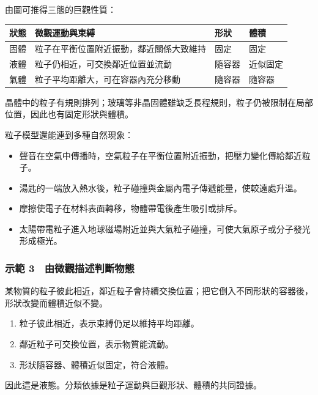 \documentclass[11pt,a4paper]{article}
\newcounter{none}
\providecommand{\tightlist}{%
  \setlength{\itemsep}{0pt}\setlength{\parskip}{0pt}}
\begin{document}
由圖可推得三態的巨觀性質：

{\def\LTcaptype{none} %
\begin{longtable}[]{@{}llll@{}}
\toprule\noalign{}
狀態 & 微觀運動與束縛 & 形狀 & 體積 \\
\midrule\noalign{}
\endhead
\bottomrule\noalign{}
\endlastfoot
固體 & 粒子在平衡位置附近振動，鄰近關係大致維持 & 固定 & 固定 \\
液體 & 粒子仍相近，可交換鄰近位置並流動 & 隨容器 & 近似固定 \\
氣體 & 粒子平均距離大，可在容器內充分移動 & 隨容器 & 隨容器 \\
\end{longtable}
}

晶體中的粒子有規則排列；玻璃等非晶固體雖缺乏長程規則，粒子仍被限制在局部位置，因此也有固定形狀與體積。

粒子模型還能連到多種自然現象：

\begin{itemize}
\tightlist
\item
  聲音在空氣中傳播時，空氣粒子在平衡位置附近振動，把壓力變化傳給鄰近粒子。
\item
  湯匙的一端放入熱水後，粒子碰撞與金屬內電子傳遞能量，使較遠處升溫。
\item
  摩擦使電子在材料表面轉移，物體帶電後產生吸引或排斥。
\item
  太陽帶電粒子進入地球磁場附近並與大氣粒子碰撞，可使大氣原子或分子發光形成極光。
\end{itemize}

\subsubsection{示範 3　由微觀描述判斷物態}\label{ux793aux7bc4-3-ux7531ux5faeux89c0ux63cfux8ff0ux5224ux65b7ux7269ux614b}

某物質的粒子彼此相近，鄰近粒子會持續交換位置；把它倒入不同形狀的容器後，形狀改變而體積近似不變。

\begin{enumerate}
\def\labelenumi{\arabic{enumi}.}
\tightlist
\item
  粒子彼此相近，表示束縛仍足以維持平均距離。
\item
  鄰近粒子可交換位置，表示物質能流動。
\item
  形狀隨容器、體積近似固定，符合液體。
\end{enumerate}

因此這是液態。分類依據是粒子運動與巨觀形狀、體積的共同證據。
\end{document}
